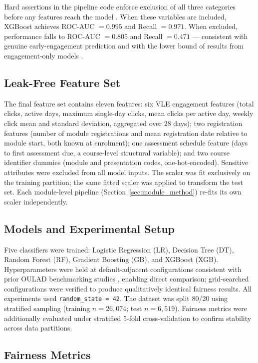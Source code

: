 \documentclass[12pt,a4paper]{article}
\begin{document}
Hard assertions in the pipeline code enforce exclusion of all three categories
before any features reach the model \citep{kaufman2012}. When these variables
are included, XGBoost achieves ROC-AUC $= 0.995$ and Recall $= 0.971$.
When excluded, performance falls to ROC-AUC $= 0.805$ and Recall $= 0.471$
--- consistent with genuine early-engagement prediction and with the lower
bound of results from engagement-only models \citep{bakhshinategh2018}.

\subsection{Leak-Free Feature Set}

The final feature set contains eleven features: six VLE engagement features
(total clicks, active days, maximum single-day clicks, mean clicks per active
day, weekly click mean and standard deviation, aggregated over 28 days); two
registration features (number of module registrations and mean registration
date relative to module start, both known at enrolment); one assessment
schedule feature (days to first assessment due, a course-level structural
variable); and two course identifier dummies (module and presentation codes,
one-hot-encoded). Sensitive attributes were excluded from all model inputs.
The scaler was fit exclusively on the training partition; the same fitted
scaler was applied to transform the test set. Each module-level pipeline
(Section~\ref{sec:module_method}) re-fits its own scaler independently.

\subsection{Models and Experimental Setup}

Five classifiers were trained: Logistic Regression (LR), Decision Tree (DT),
Random Forest (RF), Gradient Boosting (GB), and XGBoost (XGB).
Hyperparameters were held at default-adjacent configurations consistent with
prior OULAD benchmarking studies \citep{opoku2025, bakhshinategh2018},
enabling direct comparison; grid-searched configurations were verified to
produce qualitatively identical fairness results. All experiments used
\texttt{random\_state = 42}. The dataset was split 80/20 using stratified
sampling (training $n = 26{,}074$; test $n = 6{,}519$). Fairness metrics were
additionally evaluated under stratified 5-fold cross-validation to confirm
stability across data partitions.

\subsection{Fairness Metrics}
\label{sec:metrics}
\end{document}
